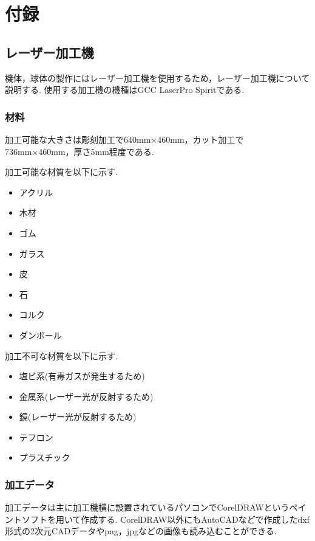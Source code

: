 \documentclass[12pt,oneside]{sotsuken_paper}
\begin{document}
\chapter*{付録}
\appendix
\renewcommand{\thesection}{A}
\renewcommand{\thesubsection}{A.\ \arabic{section}}

\section{レーザー加工機}
機体，球体の製作にはレーザー加工機を使用するため，レーザー加工機について説明する.
使用する加工機の機種はGCC LaserPro Spiritである.

\subsection{材料}
加工可能な大きさは彫刻加工で640mm×460mm，カット加工で736mm×460mm，厚さ5mm程度である.

加工可能な材質を以下に示す.

\begin{itemize}
	\item アクリル
	\item 木材
	\item ゴム
	\item ガラス
	\item 皮
	\item 石
	\item コルク
	\item ダンボール
\end{itemize}

加工不可な材質を以下に示す.

\begin{itemize}
	\item 塩ビ系(有毒ガスが発生するため)
	\item 金属系(レーザー光が反射するため)
	\item 鏡(レーザー光が反射するため)
	\item テフロン
	\item プラスチック
\end{itemize}

\subsection{加工データ}
加工データは主に加工機横に設置されているパソコンでCorelDRAWというペイントソフトを用いて作成する.
CorelDRAW以外にもAutoCADなどで作成したdxf形式の2次元CADデータやpng，jpgなどの画像も読み込むことができる.
\end{document}
